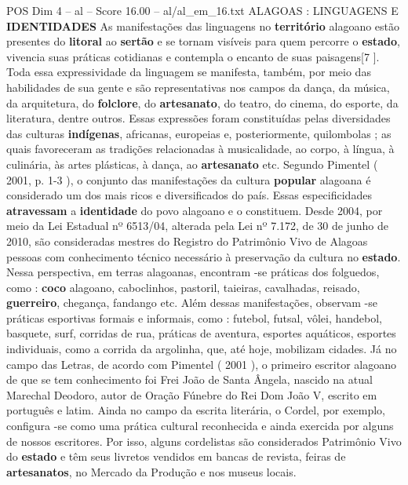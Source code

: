 \begin{textsample}{POS Dim 4 – al – Score 16.00 – al/al\_em\_16.txt}  \label{ex:f4_pos_046}
ALAGOAS : LINGUAGENS E \textbf{IDENTIDADES} As manifestações das linguagens no \textbf{território} alagoano estão presentes do \textbf{litoral} ao \textbf{sertão} e se tornam visíveis para quem percorre o \textbf{estado}, vivencia suas práticas cotidianas e contempla o encanto de suas paisagens[7 ].
Toda essa expressividade da linguagem se manifesta, também, por meio das habilidades de sua gente e são representativas nos campos da dança, da música, da arquitetura, do \textbf{folclore}, do \textbf{artesanato}, do teatro, do cinema, do esporte, da literatura, dentre outros.
Essas expressões foram constituídas pelas diversidades das culturas \textbf{indígenas}, africanas, europeias e, posteriormente, quilombolas ; as quais favoreceram as tradições relacionadas à musicalidade, ao corpo, à língua, à culinária, às artes plásticas, à dança, ao \textbf{artesanato} etc.
Segundo Pimentel ( 2001, p. 1-3 ), o conjunto das manifestações da cultura \textbf{popular} alagoana é considerado um dos mais ricos e diversificados do país.
Essas especificidades \textbf{atravessam} a \textbf{identidade} do povo alagoano e o constituem.
Desde 2004, por meio da Lei Estadual nº 6513/04, alterada pela Lei nº 7.172, de 30 de junho de 2010, são consideradas mestres do Registro do Patrimônio Vivo de Alagoas pessoas com conhecimento técnico necessário à preservação da cultura no \textbf{estado}.
Nessa perspectiva, em terras alagoanas, encontram -se práticas dos folguedos, como : \textbf{coco} alagoano, caboclinhos, pastoril, taieiras, cavalhadas, reisado, \textbf{guerreiro}, chegança, fandango etc.
Além dessas manifestações, observam -se práticas esportivas formais e informais, como : futebol, futsal, vôlei, handebol, basquete, surf, corridas de rua, práticas de aventura, esportes aquáticos, esportes individuais, como a corrida da argolinha, que, até hoje, mobilizam cidades.
Já no campo das Letras, de acordo com Pimentel ( 2001 ), o primeiro escritor alagoano de que se tem conhecimento foi Frei João de Santa Ângela, nascido na atual Marechal Deodoro, autor de Oração Fúnebre do Rei Dom João V, escrito em português e latim.
Ainda no campo da escrita literária, o Cordel, por exemplo, configura -se como uma prática cultural reconhecida e ainda exercida por alguns de nossos escritores.
Por isso, alguns cordelistas são considerados Patrimônio Vivo do \textbf{estado} e têm seus livretos vendidos em bancas de revista, feiras de \textbf{artesanatos}, no Mercado da Produção e nos museus locais.

\end{textsample}
